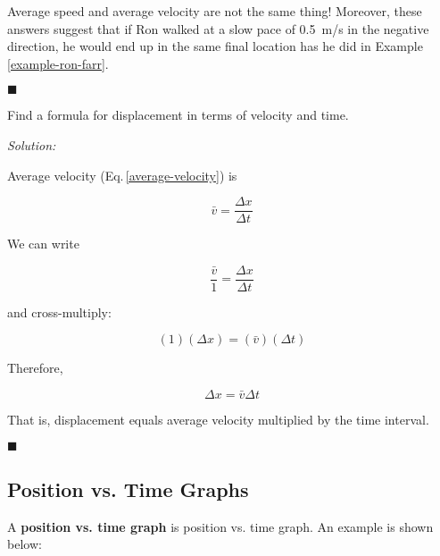 \documentclass[dvipsnames]{article}
\begin{document}
Average speed and average velocity are not the same thing! Moreover, these answers suggest that if Ron walked at a slow pace of \SI{0.5}{m/s} in the negative direction, he would end up in the same final location has he did in Example \ref{example-ron-farr}.

\hfill $\blacksquare$

\begin{example}
    Find a formula for displacement in terms of velocity and time.
\end{example}

\textit{Solution:}

Average velocity (Eq.\,\ref{average-velocity}) is

\begin{equation*}
    \bar{v} = \frac{\Delta x}{\Delta t}
\end{equation*}

We can write

\begin{equation*}
    \frac{\bar{v}}{1} = \frac{\Delta x}{\Delta t}
\end{equation*}

and cross-multiply:

\begin{equation*}
    (1)(\Delta x) = (\bar{v})(\Delta t)
\end{equation*}

Therefore,

\begin{equation} \label{displacement2}
    \Delta x = \bar{v} \Delta t
\end{equation}


That is, displacement equals average velocity multiplied by the time interval.

\hfill $\blacksquare$

\subsection{Position vs. Time Graphs}

A \textbf{\gls{position vs. time graph}} is \glsdesc{position vs. time graph}. An example is shown below:

\begin{center}
\end{center}
\end{document}
